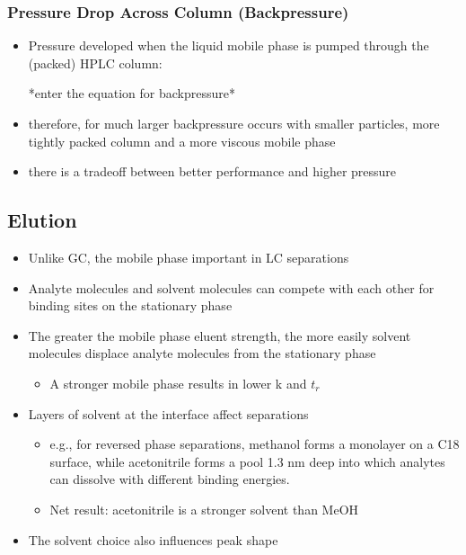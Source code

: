 \documentclass[a4paper, 12pt]{article}
\begin{document}
\subsubsection{Pressure Drop Across Column (Backpressure)}

\begin{itemize}
	\item Pressure developed when the liquid mobile phase is pumped through the (packed) HPLC column: 

*enter the equation for backpressure*

	\item therefore, for much larger backpressure occurs with smaller particles, more tightly packed column and a more viscous mobile phase
	\item there is a tradeoff between better performance and higher pressure
\end{itemize}


\subsection{Elution}

\begin{itemize}
	\item Unlike GC, the mobile phase important in LC separations
	\item Analyte molecules and solvent molecules can compete with each other for binding sites on the stationary phase 
	\item The greater the mobile phase eluent strength, the more easily solvent molecules displace analyte molecules from the stationary phase
	\begin{itemize}
		\item A stronger mobile phase results in lower k and $t_r$
	\end{itemize}
	\item Layers of solvent at the interface affect separations
	\begin{itemize}
		\item e.g., for reversed phase separations, methanol forms a monolayer on a C18 surface, while acetonitrile forms a pool 1.3 nm deep into which analytes can dissolve with different binding energies.
		\item Net result: acetonitrile is a stronger solvent than MeOH
	\end{itemize}
	\item The solvent choice also influences peak shape
\end{itemize}
\end{document}
